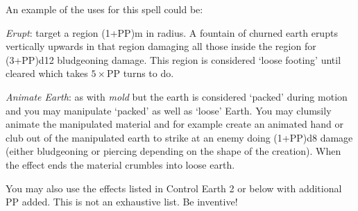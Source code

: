 \begin{multicols}{3}
{An example of the uses for this spell could be:
\begin{spellitemize}
\item {\it Erupt}: target a region (1+PP)m in radius. A fountain of churned earth erupts vertically upwards in that region\comma{} damaging all those inside the region for (3+PP)d12 bludgeoning damage. This region is considered `loose footing' until cleared\comma{} which takes $5 \times$PP turns to do. 
\item {\it Animate Earth}: as with {\it mold}\comma{} but the earth is considered `packed' during motion and you may manipulate `packed' as well as `loose' Earth. You may clumsily animate the manipulated material\comma{} and\comma{} for example\comma{} create an animated hand or club out of the manipulated earth to strike at an enemy\comma{} doing (1+PP)d8 damage (either bludgeoning or piercing\comma{} depending on the shape of the creation). When the effect ends\comma{} the material crumbles into loose earth. 
\end{spellitemize}
You may also use the effects listed in Control Earth 2 or below with \PPDifference{\DVAdpF}{\DVNovF} additional PP added. 
This is not an exhaustive list. Be inventive!}
\end{multicols}
